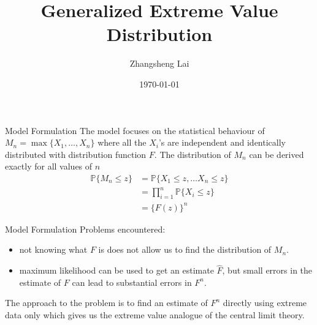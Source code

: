 \documentclass[10pt]{beamer}
\title{Generalized Extreme Value Distribution}
\subtitle{}
\author{Zhangsheng Lai}
\date{\today}
\begin{document}
\begin{frame}
\titlepage
\end{frame}



\begin{frame}{Model Formulation}
The model focuses on the statistical behaviour of $M_n = \max\{X_1,\ldots,X_n\}$ where all the $X_i$'s are independent and identically distributed with distribution function $F$. The distribution of $M_n$ can be derived exactly for all values of $n$
\begin{align}
\mathbb{P}\{M_n\leq z\} &= \mathbb{P}\{X_1\leq z , \ldots X_n \leq z\}\nonumber\\
&= \prod_{i=1}^{n}\mathbb{P}\{X_i\leq z\}\nonumber\\
&=\{F(z)\}^n \label{eq:maxofrv}
\end{align}
\end{frame}


%

\begin{frame}{Model Formulation}
Problems encountered:
\begin{itemize}
\item not knowing what $F$ is does not allow us to find the distribution of $M_n$.
\item maximum likelihood can be used to get an estimate $\widehat{F}$, but small errors in the estimate of $F$ can lead to substantial errors in $F^n$.
\end{itemize}
The approach to the problem is to find an estimate of $F^n$ directly using extreme data only which gives us the extreme value analogue of the central limit theory.
\end{frame}
\end{document}
